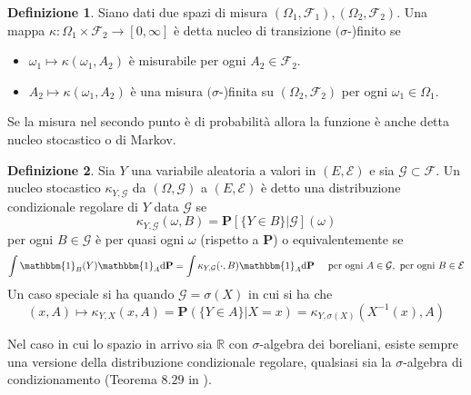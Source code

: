 \documentclass[a4paper,11pt]{book}
\theoremstyle{plain}
\theoremstyle{definition}
\newtheorem{defn}{Definizione}[chapter]
\theoremstyle{remark}
\newcommand{\R}{\mathbb{R}}
\newcommand{\F}{\mathcal{F}}
\newcommand{\Pro}{\mathbf{P}}
\begin{document}
\begin{defn}
	Siano dati due spazi di misura $(\Omega_1,\F_1),(\Omega_2,\F_2)$. Una mappa $\kappa:\Omega_1\times \F_2\rightarrow [0,\infty]$ è detta nucleo di transizione $(\sigma$-)finito se 
	\begin{itemize}
		\item $\omega_1\mapsto\kappa(\omega_1,A_2)$ è misurabile per ogni $A_2\in\F_2$.
		\item $A_2\mapsto \kappa(\omega_1,A_2)$ è una misura $(\sigma$-)finita su $(\Omega_2,\F_2)$ per ogni $\omega_1\in\Omega_1$.
	\end{itemize}
Se la misura nel secondo punto è di probabilità allora la funzione è anche detta nucleo stocastico o di Markov.
\end{defn}
\begin{defn}
	Sia $Y$ una variabile aleatoria a valori in $(E,\mathcal{E})$  e sia $\mathcal{G}\subset \F$. Un nucleo stocastico $\kappa_{Y,\mathcal{G}}$ da $(\Omega,\mathcal{G})$ a $(E,\mathcal{E})$ è detto una distribuzione condizionale regolare di $Y$ data $\mathcal{G}$ se 
	\begin{equation*}
		\kappa_{Y,\mathcal{G}}(\omega, B) = \Pro[\{Y\in B\}|\mathcal{G}](\omega)
	\end{equation*}
	per ogni $B\in \mathcal{G}$ è per quasi ogni $\omega$ (rispetto a $\Pro$) o equivalentemente se
	\begin{equation*}
		\int \mathbbm{1}_B(Y)\mathbbm{1}_A\text{d}\Pro = \int \kappa_{Y,\mathcal{G}}(\cdot,B)\mathbbm{1}_A\text{d}\Pro \;\;\;\;\; \text{per ogni } A\in \mathcal{G},\text{ per ogni } B\in \mathcal{E}
	\end{equation*}
	Un caso speciale si ha quando $\mathcal{G}=\sigma(X)$ in cui si ha che 
	\begin{equation*}
		(x,A)\mapsto \kappa_{Y,X}(x,A) = \Pro(\{Y\in A\}|X=x)=\kappa_{Y,\sigma(X)}(X^{-1}(x),A)
	\end{equation*}
\end{defn}
Nel caso in cui lo spazio in arrivo sia $\R$ con $\sigma$-algebra dei boreliani, esiste sempre una versione della distribuzione condizionale regolare, qualsiasi sia la $\sigma$-algebra di condizionamento (Teorema $8.29$ in \cite{Klenke}).
\end{document}
